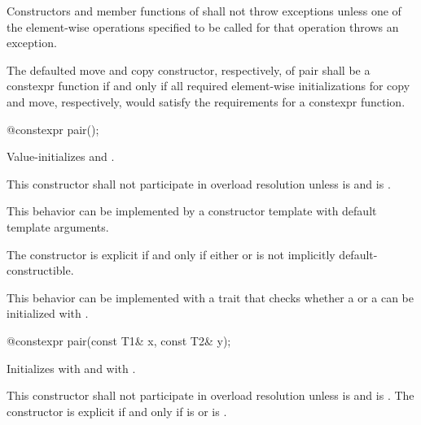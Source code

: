 \pnum
Constructors and member functions of  shall not throw exceptions unless one of
the element-wise operations specified to be called for that operation
throws an exception.

\pnum
The defaulted move and copy constructor, respectively, of pair shall
be a constexpr function if and only if all required element-wise
initializations for copy and move, respectively, would satisfy the
requirements for a constexpr function.

%
\begin{itemdecl}
@\EXPLICIT@ constexpr pair();
\end{itemdecl}

\begin{itemdescr}
\pnum
\effects
Value-initializes  and .

\pnum
\remarks
This constructor shall not participate in overload resolution unless
 is  and
 is .
\begin{note} This behavior can be implemented by a constructor template
with default template arguments. \end{note}
The constructor is explicit if and only if either  or
 is not implicitly default-constructible.
\begin{note} This behavior can be implemented with a trait that checks
whether a  or a 
can be initialized with \tcode{\{\}}. \end{note}
\end{itemdescr}

%
\begin{itemdecl}
@\EXPLICIT@ constexpr pair(const T1& x, const T2& y);
\end{itemdecl}

\begin{itemdescr}
\pnum
\effects
Initializes  with  and  with .

\pnum
\remarks This constructor shall not participate in overload resolution
unless  is  and
 is .
The constructor is explicit if and only if
 is  or
 is .
\end{itemdescr}


